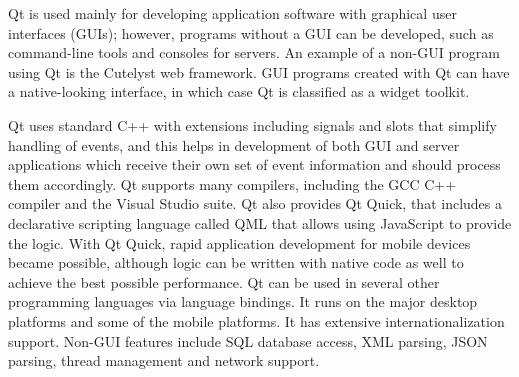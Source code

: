 Qt is used mainly for developing application software with graphical user interfaces (GUIs); however, programs without a GUI can be developed, such as command-line tools and consoles for servers. An example of a non-GUI program using Qt is the Cutelyst web framework. GUI programs created with Qt can have a native-looking interface, in which case Qt is classified as a widget toolkit.

Qt uses standard C++ with extensions including signals and slots that simplify handling of events, and this helps in development of both GUI and server applications which receive their own set of event information and should process them accordingly. Qt supports many compilers, including the GCC C++ compiler and the Visual Studio suite. Qt also provides Qt Quick, that includes a declarative scripting language called QML that allows using JavaScript to provide the logic. With Qt Quick, rapid application development for mobile devices became possible, although logic can be written with native code as well to achieve the best possible performance. Qt can be used in several other programming languages via language bindings. It runs on the major desktop platforms and some of the mobile platforms. It has extensive internationalization support. Non-GUI features include SQL database access, XML parsing, JSON parsing, thread management and network support.
